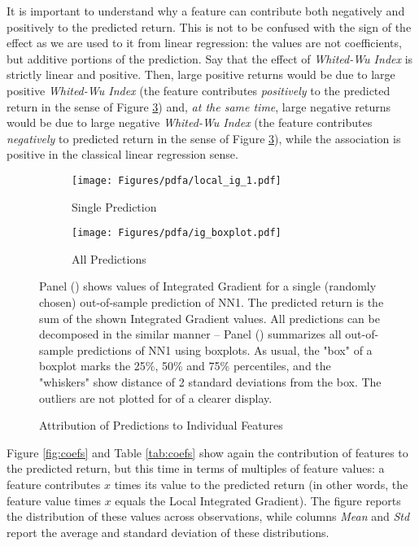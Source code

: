 	It is important to understand why a feature can contribute both negatively and positively to the predicted return. This is not to be confused with the sign of the effect as we are used to it from linear regression: the values are not coefficients, but additive portions of the prediction. Say that the effect of \textit{Whited-Wu Index} is strictly linear and positive. Then, large positive returns would be due to large positive\textit{ Whited-Wu Index} (the feature contributes \textit{positively} to the predicted return in the sense of Figure \ref{fig:local_ig}) and, \textit{at the same time}, large negative returns would be due to large negative \textit{Whited-Wu Index} (the feature contributes \textit{negatively} to predicted return in the sense of Figure \ref{fig:local_ig}), while the association is positive in the classical linear regression sense. 
		
	\begin{figure}	
		\centering		
		\begin{subfigure}[t]{\textwidth}
			\texttt{[image: Figures/pdfa/local\_ig\_1.pdf]}
			\caption{Single Prediction}
			\label{fig:local_ig_1}
		\end{subfigure}
		
		\begin{subfigure}[t]{\textwidth}
			\centering
			\texttt{[image: Figures/pdfa/ig\_boxplot.pdf]}
			\caption{All Predictions}
			\label{fig:local_ig_boxplot}
		\end{subfigure}
		\caption{Attribution of Predictions to Individual Features}
		\medskip
		\small
		Panel () shows values of Integrated Gradient for a single (randomly chosen) out-of-sample prediction of NN1. The predicted return is the sum of the shown Integrated Gradient values. All predictions can be decomposed in the similar manner -- Panel () summarizes all out-of-sample predictions of NN1 using boxplots. As usual, the "box" of a boxplot marks the 25\%, 50\% and 75\% percentiles, and the "whiskers" show distance of 2 standard deviations from the box. The outliers are not plotted for of a clearer display.
		\label{fig:local_ig}
	\end{figure}

	
	Figure \ref{fig:coefs} and Table \ref{tab:coefs} show again the contribution of features to the predicted return, but this time in terms of multiples of feature values: a feature contributes $x$ times its value to the predicted return (in other words, the feature value times $x$ equals the Local Integrated Gradient). The figure reports the distribution of these values across observations, while columns \textit{Mean} and \textit{Std} report the average and standard deviation of these distributions.  
	
